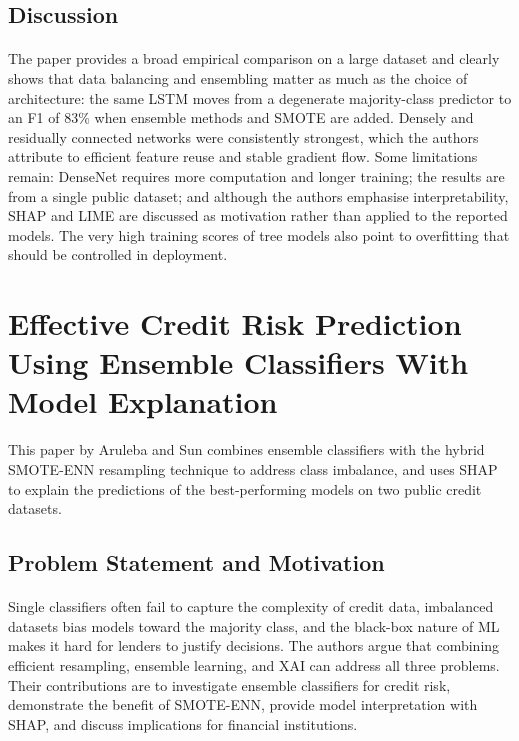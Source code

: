 \documentclass[12pt,a4paper,final]{extreport}
\begin{document}
\subsection{Discussion}

\paragraph{} The paper provides a broad empirical comparison on a large dataset and clearly shows that data balancing and ensembling matter as much as the choice of architecture: the same LSTM moves from a degenerate majority-class predictor to an F1 of 83\% when ensemble methods and SMOTE are added. Densely and residually connected networks were consistently strongest, which the authors attribute to efficient feature reuse and stable gradient flow. Some limitations remain: DenseNet requires more computation and longer training; the results are from a single public dataset; and although the authors emphasise interpretability, SHAP and LIME are discussed as motivation rather than applied to the reported models. The very high training scores of tree models also point to overfitting that should be controlled in deployment.

\section{Effective Credit Risk Prediction Using Ensemble Classifiers With Model Explanation}

This paper by Aruleba and Sun \cite{p3} combines ensemble classifiers with the hybrid SMOTE-ENN resampling technique to address class imbalance, and uses SHAP to explain the predictions of the best-performing models on two public credit datasets.

\subsection{Problem Statement and Motivation}

\paragraph{} Single classifiers often fail to capture the complexity of credit data, imbalanced datasets bias models toward the majority class, and the black-box nature of ML makes it hard for lenders to justify decisions. The authors argue that combining efficient resampling, ensemble learning, and XAI can address all three problems. Their contributions are to investigate ensemble classifiers for credit risk, demonstrate the benefit of SMOTE-ENN, provide model interpretation with SHAP, and discuss implications for financial institutions.
\end{document}
